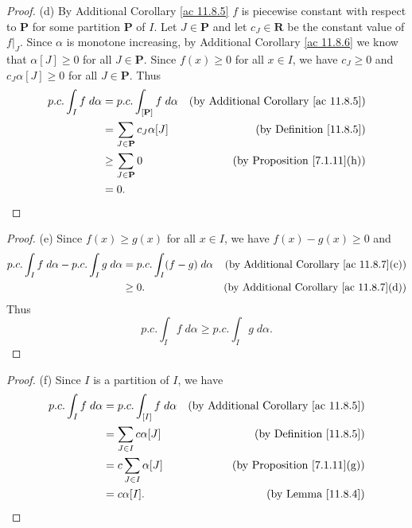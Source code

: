 \begin{proof}{(d)}
    By Additional Corollary \ref{ac 11.8.5} \(f\) is piecewise constant with respect to \(\mathbf{P}\) for some partition \(\mathbf{P}\) of \(I\).
    Let \(J \in \mathbf{P}\) and let \(c_J \in \mathbf{R}\) be the constant value of \(f|_J\).
    Since \(\alpha\) is monotone increasing, by Additional Corollary \ref{ac 11.8.6} we know that \(\alpha[J] \geq 0\) for all \(J \in \mathbf{P}\).
    Since \(f(x) \geq 0\) for all \(x \in I\), we have \(c_J \geq 0\) and \(c_J \alpha[J] \geq 0\) for all \(J \in \mathbf{P}\).
    Thus
    \begin{align*}
        p.c. \int_I f \; d \alpha & = p.c. \int_{[\mathbf{P}]} f \; d \alpha & \text{(by Additional Corollary \ref{ac 11.8.5})} \\
                                  & = \sum_{J \in \mathbf{P}} c_J \alpha[J]  & \text{(by Definition \ref{11.8.5})}              \\
                                  & \geq \sum_{J \in \mathbf{P}} 0           & \text{(by Proposition \ref{7.1.11}(h))}          \\
                                  & = 0.
    \end{align*}
\end{proof}

\begin{proof}{(e)}
    Since \(f(x) \geq g(x)\) for all \(x \in I\), we have \(f(x) - g(x) \geq 0\) and
    \begin{align*}
        p.c. \int_I f \; d \alpha - p.c. \int_I g \; d \alpha & = p.c. \int_I (f - g) \; d \alpha & \text{(by Additional Corollary \ref{ac 11.8.7}(c))} \\
                                                              & \geq 0.                           & \text{(by Additional Corollary \ref{ac 11.8.7}(d))}
    \end{align*}
    Thus
    \[
        p.c. \int_I f \; d \alpha \geq p.c. \int_I g \; d \alpha.
    \]
\end{proof}

\begin{proof}{(f)}
    Since \(I\) is a partition of \(I\), we have
    \begin{align*}
        p.c. \int_I f \; d \alpha & = p.c. \int_{[I]} f \; d \alpha & \text{(by Additional Corollary \ref{ac 11.8.5})} \\
                                  & = \sum_{J \in I} c \alpha[J]    & \text{(by Definition \ref{11.8.5})}              \\
                                  & = c \sum_{J \in I} \alpha[J]    & \text{(by Proposition \ref{7.1.11}(g))}          \\
                                  & = c \alpha[I].                  & \text{(by Lemma \ref{11.8.4})}
    \end{align*}
\end{proof}


